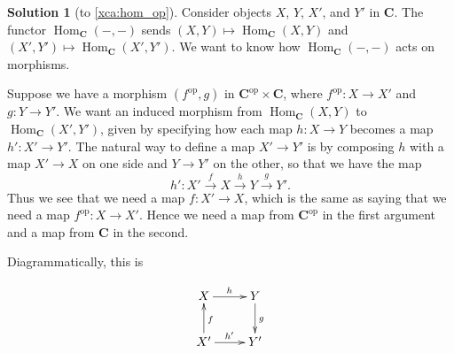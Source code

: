 \documentclass{amsart}
\theoremstyle{definition} \newaliasedtheorem{defn}[thm]{Definition}
\theoremstyle{definition} \newtheorem*{defn*}{Definition}
\theoremstyle{definition} \newaliasedtheorem{xca}[thm]{Exercise}
\theoremstyle{definition} \newtheorem*{soln*}{Solution}
\theoremstyle{definition} \newaliasedtheorem{remark}[thm]{Remark}
\theoremstyle{definition} \newtheorem*{remark*}{Remark}
\newcommand{\cat}[1]{\ensuremath{\mathbf{#1}}}
\DeclareMathOperator{\Hom}{Hom}
\begin{document}
%      
    
    \begin{soln*}[to \autoref{xca:hom_op}] \label{sol:hom_op}
      Consider objects $X$, $Y$, $X'$, and $Y'$ in $\cat C$.  The functor $\Hom_{\cat C}(-, -)$ sends $(X, Y) \mapsto \Hom_{\cat C}(X, Y)$ and $(X', Y') \mapsto \Hom_{\cat C}(X', Y')$.  We want to know how $\Hom_{\cat C}(-, -)$ acts on morphisms.
      
      Suppose we have a morphism $(f^\text{op}, g)$ in $\cat C^\text{op} \times \cat C$, where $f^\text{op} : X \to X'$ and $g : Y \to Y'$.  We want an induced morphism from $\Hom_{\cat C}(X, Y)$ to $\Hom_{\cat C}(X', Y')$, given by specifying how each map $h: X \to Y$ becomes a map $h': X' \to Y'$.  The natural way to define a map $X' \to Y'$ is by composing $h$ with a map $X' \to X$ on one side and $Y \to Y'$ on the other, so that we have the map
      \[
        h' : X' \xrightarrow{f} X \xrightarrow{h} Y \xrightarrow{g} Y'.
      \]
      Thus we see that we need a map $f : X' \to X$, which is the same as saying that we need a map $f^\text{op} : X \to X'$.  Hence we need a map from $\cat C^\text{op}$ in the first argument and a map from $\cat C$ in the second.
      
      Diagrammatically, this is
      
    \[
      \xymatrix{
        X \ar[r]^h & Y \ar[d]^g \\
        X' \ar[u]_{f} \ar[r]^{h'} & Y' \\
      }
    \]
      
    \end{soln*}
    
\end{document}
